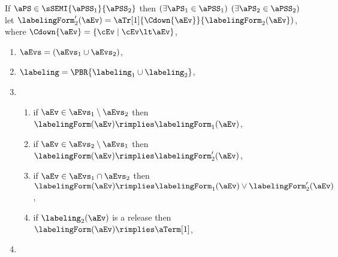 \begin{definition}
  \pagebreak
  \noindent
  If $\aPS \in \sSEMI{\aPSS_1}{\aPSS_2}$ then $(\exists\aPS_1\in\aPSS_1)$
  $(\exists\aPS_2\in\aPSS_2)$
  let $\labelingForm'_2(\aEv)=\aTr[1]{\Cdown{\aEv}}{\labelingForm_2(\aEv})$,
  where $\Cdown{\aEv}=\{ \cEv \mid \cEv \lt \aEv \}$, %
  \begin{multicols}{2}
    \begin{enumerate}[topsep=0pt,label=(\textsc{s}\arabic*),ref=\textsc{s}\arabic*]
    \item \label{seq-E}
      $\aEvs = (\aEvs_1\cup\aEvs_2)$,
    \item \label{seq-lambda}
      ${\labeling}=\PBR{{\labeling_1}\cup {\labeling_2}}$, 
    \item[] 
      \begin{enumerate}[leftmargin=0pt]
      \item \label{seq-kappa1}
        if $\aEv\in\aEvs_1\setminus\aEvs_2$ then $\labelingForm(\aEv) \rimplies \labelingForm_1(\aEv)$,
      \item \label{seq-kappa2}
        if $\aEv\in\aEvs_2\setminus\aEvs_1$ then $\labelingForm(\aEv) \rimplies \labelingForm'_2(\aEv)$,
      \item \label{seq-kappa12}
        if $\aEv\in\aEvs_1\cap\aEvs_2$ then $\labelingForm(\aEv) \rimplies \labelingForm_1(\aEv)\lor\labelingForm'_2(\aEv)$,
      \item \label{seq-kappa-release}
        if $\labeling_2(\aEv)$ is a release then $\labelingForm(\aEv) \rimplies \aTerm[1]$,
      \end{enumerate}
    \item \label{seq-tau}

\end{enumerate}
\end{multicols}
\end{definition}
